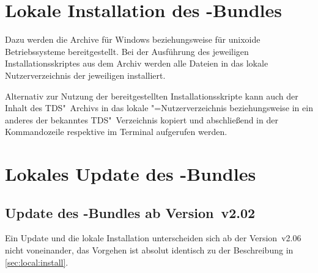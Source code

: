 \section{%
  Lokale Installation des \TUDScript-Bundles%
  \label{sec:local:install}%
}


Dazu werden die Archive  
für Windows beziehungsweise  
für unixoide Betriebssysteme bereitgestellt. Bei der Ausführung des jeweiligen 
Installationsskriptes aus dem Archiv werden alle Dateien in das lokale 
Nutzerverzeichnis der jeweiligen \Distro installiert. 

Alternativ zur Nutzung der bereitgestellten Installationsskripte kann auch der 
Inhalt des TDS"~Archivs  in das 
lokale "=Nutzerverzeichnis beziehungsweise in ein anderes der 
\Distro bekanntes TDS"~Verzeichnis kopiert und abschließend in der 
Kommandozeile respektive im Terminal  aufgerufen werden. 



\section{%
  Lokales Update des \TUDScript-Bundles%
  \label{sec:local:update}%
}
\subsection{Update des \TUDScript-Bundles ab Version~v2.02}

Ein Update und die lokale Installation unterscheiden sich ab der Version~v2.06 
nicht voneinander, das Vorgehen ist absolut identisch zu der Beschreibung in 
\autoref{sec:local:install}.



